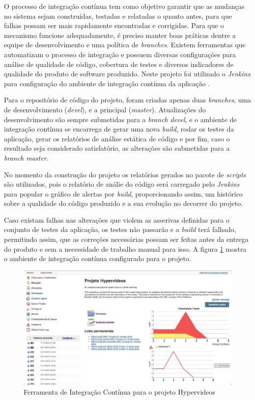 O processo de integração contínua tem como objetivo garantir que as mudanças no sistema sejam construídas, testadas e relatadas o quanto antes, para que falhas possam ser mais rapidamente encontradas e corrigidas. Para que o mecanismo funcione adequadamente, é preciso manter boas práticas dentre a equipe de desenvolvimento e uma política de \textit{branches}. Existem ferramentas que automatizam o processo de integração e possuem diversas configurações para análise de qualidade de código, cobertura de testes e diversos indicadores de qualidade do produto de software produzido. Neste projeto foi utilizado o \textit{Jenkins} para configuração do ambiente de integração contínua da aplicação \cite{jenkins2015}.

Para o repositório de código do projeto, foram criadas apenas duas \textit{branches}, uma de desenvolvimento (\textit{devel}), e a principal (\textit{master}). Atualizações do desenvolvimento são sempre submetidas para a \textit{branch devel}, e o ambiente de integração contínua se encarrega de gerar uma nova \textit{build}, rodar os testes da aplicação, gerar os relatórios de análise estática de código e por fim, caso o resultado seja considerado satisfatório, as alterações são submetidas para a \textit{branch master}. 

No momento da construção do projeto os relatórios gerados no pacote de \textit{scripts} são utilizados, pois o relatório de análie do código será carregado pelo \textit{Jenkins} para popular o gráfico de alertas por \textit{build}, proporcionando assim, um histórico sobre a qualidade do código produzido e a sua evolução no decorrer do projeto. 

Caso existam falhas nas alterações que violem as asserivas definidas para o conjunto de testes da aplicação, os testes não passarão e a \textit{build} terá falhado, permitindo assim, que as correções necessárias possam ser feitas antes da entrega do produto e sem a necessidade de trabalho manual para isso. A figura \ref{fig:jenkins} mostra o ambiente de integração contínua configurado para o projeto. 

\begin{figure}[h!]
  	\centering
  	\includegraphics[width=1\linewidth]{figuras/jenkins.eps}
  	\caption{Ferramenta de Integração Contínua para o projeto Hypervideos}
  	\label{fig:jenkins}
\end{figure}

